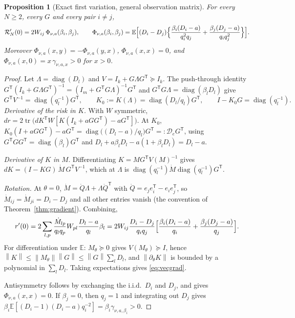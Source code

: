 \documentclass[11pt,a4paper]{article}
\numberwithin{equation}{section}
\newtheorem{proposition}[theorem]{Proposition}
\theoremstyle{remark}\newtheorem{remark}[theorem]{Remark}
\newcommand{\E}{\mathbb E}
\newcommand{\tr}{\operatorname{tr}}
\newcommand{\diag}{\operatorname{diag}}
\newcommand{\risk}{\mathcal R}
\newcommand{\T}{^{\mathsf T}}
\newcommand{\norm}[1]{\left\lVert#1\right\rVert}
\begin{document}
\begin{proposition}[Exact first variation, general observation matrix]\label{prop:vector}
For every \(N\ge2\), every \(G\) and every pair \(i\ne j\),
\begin{equation}\label{eq:vecgrad}
 \risk_N'(0)=2W_{ij}\,\Phi_{\nu,a}(\beta_i,\beta_j),\qquad
 \Phi_{\nu,a}(\beta_i,\beta_j)=\E\Bigl[(D_i-D_j)\Bigl\{
 \frac{\beta_i(D_i-a)}{q_i^2q_j}+\frac{\beta_j(D_j-a)}{q_iq_j^2}\Bigr\}\Bigr].
\end{equation}
Moreover \(\Phi_{\nu,a}(x,y)=-\Phi_{\nu,a}(y,x)\), \(\Phi_{\nu,a}(x,x)=0\), and
\(\Phi_{\nu,a}(x,0)=x\,\gamma_{\nu,a,x}>0\) for \(x>0\).
\end{proposition}
\begin{proof}
Let \(\Lambda=\diag(D_l)\) and \(V=I_k+G\Lambda G\T\succeq I_k\). The push-through identity
\(G\T(I_k+G\Lambda G\T)^{-1}=(I_m+G\T G\Lambda)^{-1}G\T\) and \(G\T G\Lambda=\diag(\beta_lD_l)\)
give
\[
 G\T V^{-1}=\diag(q_l^{-1})G\T,\qquad
 K_0:=K(\Lambda)=\diag(D_l/q_l)G\T,\qquad
 I-K_0G=\diag(q_l^{-1}).
\]
\emph{Derivative of the risk in \(K\).} With \(W\) symmetric,
\(dr=2\tr\bigl(dK\T W[K(I_k+aGG\T)-aG\T]\bigr)\). At \(K_0\),
\(K_0(I+aGG\T)-aG\T=\diag\bigl((D_l-a)/q_l\bigr)G\T=:\mathcal D_eG\T\), using
\(G\T GG\T=\diag(\beta_l)G\T\) and \(D_l+a\beta_lD_l-a(1+\beta_lD_l)=D_l-a\).

\emph{Derivative of \(K\) in \(M\).} Differentiating \(K=MG\T V(M)^{-1}\) gives
\(dK=(I-KG)\,\dot M\,G\T V^{-1}\), which at \(\Lambda\) is
\(\diag(q_l^{-1})\dot M\diag(q_l^{-1})G\T\).

\emph{Rotation.} At \(\theta=0\), \(\dot M=\dot Q\Lambda+\Lambda\dot Q\T\) with
\(\dot Q=e_je_i\T-e_ie_j\T\), so \(\dot M_{ij}=\dot M_{ji}=D_i-D_j\) and all other entries vanish
(the convention of Theorem~\ref{thm:gradient}). Combining,
\[
 r'(0)=2\sum_{l,p}\frac{\dot M_{lp}}{q_lq_p}W_{pl}\frac{D_l-a}{q_l}\beta_l
 =2W_{ij}\frac{D_i-D_j}{q_iq_j}\Bigl[\frac{\beta_i(D_i-a)}{q_i}+\frac{\beta_j(D_j-a)}{q_j}\Bigr].
\]
For differentiation under \(\E\): \(M_\theta\succeq0\) gives \(V(M_\theta)\succeq I\), hence
\(\norm K\le\norm{M_\theta}\norm G\le\norm G\sum_lD_l\), and \(\norm{\partial_\theta K}\) is bounded by a
polynomial in \(\sum_lD_l\). Taking expectations gives \eqref{eq:vecgrad}.

Antisymmetry follows by exchanging the i.i.d.\ \(D_i\) and \(D_j\), and gives
\(\Phi_{\nu,a}(x,x)=0\). If \(\beta_j=0\), then \(q_j=1\) and integrating out \(D_j\) gives
\(\beta_i\E[(D_i-1)(D_i-a)q_i^{-2}]=\beta_i\gamma_{\nu,a,\beta_i}>0\).
\end{proof}
\end{document}
